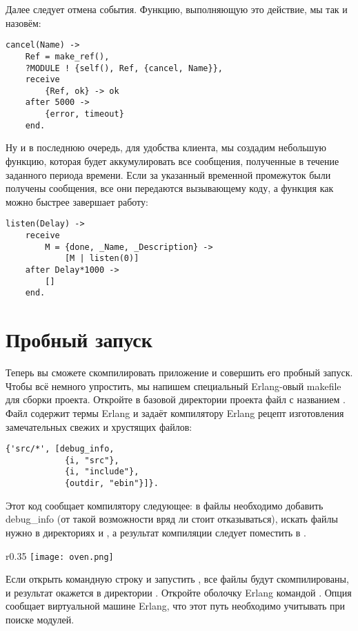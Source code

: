 Далее следует отмена события.
Функцию, выполняющую это действие, мы так и назовём:
\begin{lstlisting}[style=erlang]
cancel(Name) ->
    Ref = make_ref(),
    ?MODULE ! {self(), Ref, {cancel, Name}},
    receive
        {Ref, ok} -> ok
    after 5000 ->
        {error, timeout}
    end.
\end{lstlisting}

Ну и в последнюю очередь, для удобства клиента, мы создадим небольшую функцию, которая будет аккумулировать все сообщения, полученные в течение заданного периода времени.
Если за указанный временной промежуток были получены сообщения, все они передаются вызывающему коду, а функция как можно быстрее завершает работу:
\begin{lstlisting}[style=erlang]
listen(Delay) ->
    receive
        M = {done, _Name, _Description} ->
            [M | listen(0)]
    after Delay*1000 ->
        []
    end.
\end{lstlisting}
\section{Пробный запуск}
\label{a-test-drive}
Теперь вы сможете скомпилировать приложение и совершить его пробный запуск.
Чтобы всё немного упростить, мы напишем специальный Erlang\--овый makefile для сборки проекта.
Откройте в базовой директории проекта файл с названием .
Файл содержит термы Erlang и задаёт компилятору Erlang рецепт изготовления замечательных свежих и хрустящих  файлов:
\begin{lstlisting}[style=erlang]
{'src/*', [debug_info,
            {i, "src"},
            {i, "include"},
            {outdir, "ebin"}]}.
\end{lstlisting}

Этот код сообщает компилятору следующее: в файлы необходимо добавить debug\_info (от такой возможности вряд ли стоит отказываться), искать файлы нужно в директориях  и , а результат компиляции следует поместить в .

\begin{wrapfigure}{r}{0.35\linewidth}
    \texttt{[image: oven.png]}
\end{wrapfigure}

Если открыть командную строку и запустить , все файлы будут скомпилированы, и результат окажется в директории .
Откройте оболочку Erlang командой .
Опция  сообщает виртуальной машине Erlang, что этот путь необходимо учитывать при поиске модулей.

